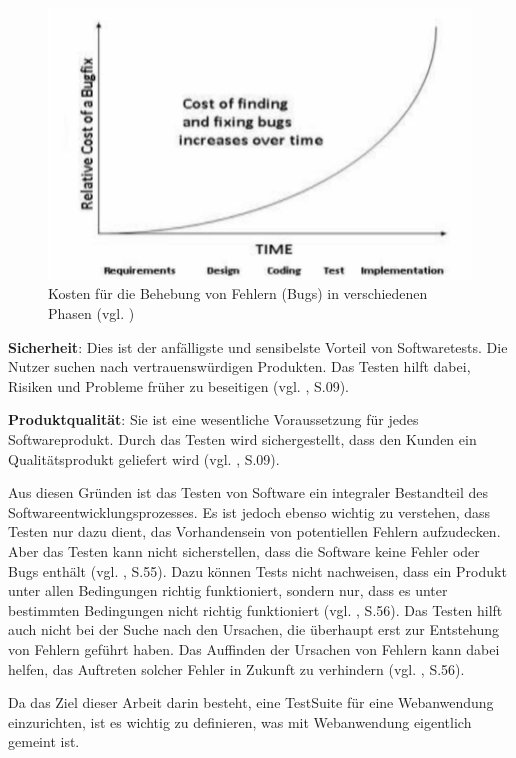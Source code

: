 \begin{figure}[h]
    \centering
    \includegraphics[scale=0.5]{images/Cost-of-fixing-bugs-in-different-phases}
    \caption{Kosten für die Behebung von Fehlern (Bugs) in verschiedenen Phasen (vgl. \cite{kumar2010software})} \label{fig:mof}
\end{figure}


\textbf{Sicherheit}: Dies ist der anfälligste und
sensibelste Vorteil von Softwaretests. Die Nutzer suchen
nach vertrauenswürdigen Produkten. Das Testen hilft
dabei, Risiken und Probleme früher zu beseitigen
(vgl. \cite{shultz2011software}, S.09).

\textbf{Produktqualität}: Sie ist eine wesentliche
Voraussetzung für jedes Softwareprodukt. Durch das
Testen wird sichergestellt, dass den Kunden ein
Qualitätsprodukt geliefert wird
(vgl. \cite{shultz2011software}, S.09).


Aus diesen Gründen ist das Testen von Software ein
integraler Bestandteil des Softwareentwicklungsprozesses.
Es ist jedoch ebenso wichtig zu verstehen, dass Testen nur
dazu dient, das Vorhandensein von potentiellen Fehlern
aufzudecken. Aber das Testen kann nicht sicherstellen, dass
die Software keine Fehler oder Bugs enthält (vgl. \cite{kumar2010software}, S.55).
Dazu können Tests nicht nachweisen, dass ein Produkt unter allen
Bedingungen richtig funktioniert, sondern nur, dass es unter
bestimmten Bedingungen nicht richtig funktioniert (vgl. \cite{kumar2010software}, S.56).
Das Testen hilft auch nicht bei der Suche nach den Ursachen,
die überhaupt erst zur Entstehung von Fehlern geführt haben.
Das Auffinden der Ursachen von Fehlern kann dabei helfen,
das Auftreten solcher Fehler in Zukunft zu verhindern (vgl. \cite{kumar2010software}, S.56).


Da das Ziel dieser Arbeit darin besteht, eine \Gls{TestSuite} für
eine Webanwendung einzurichten, ist es wichtig zu
definieren, was mit Webanwendung eigentlich gemeint ist.
